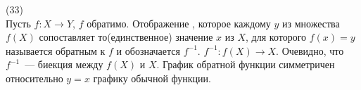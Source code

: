 (33)\\
Пусть $f: X \to Y$, $f$ обратимо. Отображение , которое каждому $y$ из множества $f(X)$ сопоставляет то(единственное) значение $x$ из $X$, для которого $f(x) = y$ называется обратным к $f$ и обозначается $f^{-1}$. $f^{-1}: f(X) \to X$. Очевидно, что $f^{-1}$~--- биекция между $f(X)$ и $X$. График обратной функции симметричен относительно $y=x$ графику обычной функции.